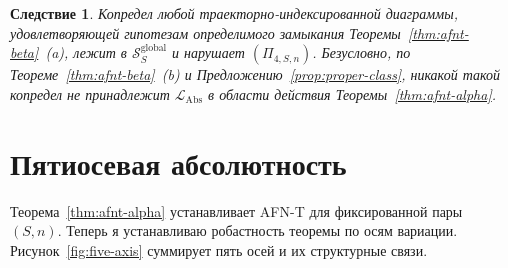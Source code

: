 \documentclass[11pt]{article}
\theoremstyle{plain}
\newtheorem{corollary}[theorem]{Следствие}
\theoremstyle{definition}
\newcommand{\cS}{\mathcal{S}}
\newcommand{\LAbs}{\mathcal{L}_{\mathrm{Abs}}}
\begin{document}
\begin{corollary}
Копредел любой траекторно-индексированной диаграммы, удовлетворяющей гипотезам определимого замыкания Теоремы~\ref{thm:afnt-beta}~(a), лежит в $\cS_S^{\mathrm{global}}$ и нарушает $(\Pi_{4, S, n})$. Безусловно, по Теореме~\ref{thm:afnt-beta}~(b) и Предложению~\ref{prop:proper-class}, никакой такой копредел не принадлежит $\LAbs$ в области действия Теоремы~\ref{thm:afnt-alpha}.
\end{corollary}

\section{Пятиосевая абсолютность}\label{sec:five-axis}

Теорема~\ref{thm:afnt-alpha} устанавливает AFN-T для фиксированной пары $(S, n)$. Теперь я устанавливаю робастность теоремы по осям вариации. Рисунок~\ref{fig:five-axis} суммирует пять осей и их структурные связи.
\end{document}
